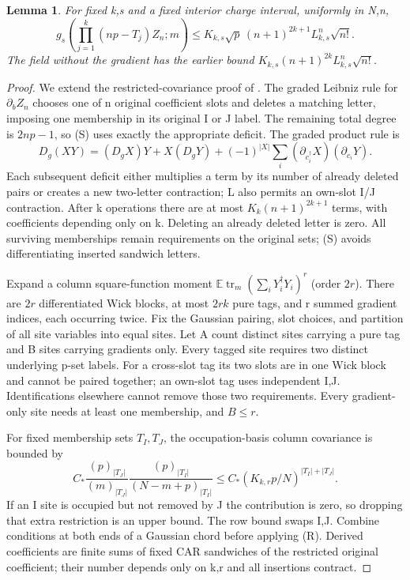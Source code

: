 \documentclass[11pt]{article}
\newcommand{\E}{\mathbb E}
\newcommand{\tr}{\operatorname{tr}}
\newtheorem{lemma}{Lemma}
\begin{document}
\begin{lemma}\label{lem:pure}
For fixed k,s and a fixed interior charge interval, uniformly in N,n,
\[
 g_s\!\left(\prod_{j=1}^k(np-T_j)Z_n;m\right)
 \le K_{k,s}\sqrt p\,(n+1)^{2k+1}L_{k,s}^n\sqrt{n!}. \tag{W}
\]
The field without the gradient has the earlier bound
$K_{k,s}(n+1)^{2k}L_{k,s}^n\sqrt{n!}$.
\end{lemma}
\begin{proof}
We extend the restricted-covariance proof of \cite{diagram}.
The graded Leibniz rule for $\partial_bZ_n$ chooses one of n
original coefficient slots and deletes a matching letter, imposing
one membership in its original I or J label. The remaining total
degree is $2np-1$, so (S) uses exactly the appropriate deficit.
The graded product rule is
\[
 D_g(XY)=(D_gX)Y+X(D_gY)
       +(-1)^{|X|}\sum_i(\partial_{c_i^\dagger}X)(\partial_{c_i}Y).
\]
Each subsequent deficit either multiplies a term by its number
of already deleted pairs or creates a new two-letter contraction;
L also permits an own-slot I/J contraction. After k operations
there are at most $K_k(n+1)^{2k+1}$ terms, with coefficients
depending only on k. Deleting an already deleted letter is zero.
All surviving memberships remain requirements on the original
sets; (S) avoids differentiating inserted sandwich letters.

Expand a column square-function moment
$\E\tr_m(\sum_iY_i^\dagger Y_i)^r$ (order $2r$).
There are $2r$ differentiated Wick blocks, at most $2rk$ pure
tags, and r summed gradient indices, each occurring twice.
Fix the Gaussian pairing, slot choices, and partition of all
site variables into equal sites. Let A count distinct sites
carrying a pure tag and B sites carrying gradients only.
Every tagged site requires two distinct underlying p-set labels.
For a cross-slot tag its two slots are in one Wick block and
cannot be paired together; an own-slot tag uses independent I,J.
Identifications elsewhere cannot remove those two requirements.
Every gradient-only site needs at least one membership, and $B\le r$.

For fixed membership sets $T_I,T_J$, the occupation-basis column
covariance is bounded by
\[
 C_*\frac{(p)_{|T_J|}}{(m)_{|T_J|}}
       \frac{(p)_{|T_I|}}{(N-m+p)_{|T_I|}}
 \le C_*(K_{k,r}p/N)^{|T_I|+|T_J|}. \tag{R}
\]
If an I site is occupied but not removed by J the contribution
is zero, so dropping that extra restriction is an upper bound.
The row bound swaps I,J. Combine conditions at both ends of a
Gaussian chord before applying (R). Derived coefficients are
finite sums of fixed CAR sandwiches of the restricted original
coefficient; their number depends only on k,r and all insertions
contract.


\end{proof}
\end{document}
